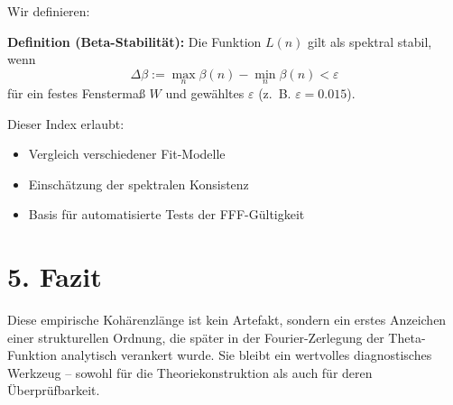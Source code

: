 \documentclass[12pt]{article}
\begin{document}
Wir definieren:

\textbf{Definition (Beta-Stabilität):}  
Die Funktion \( L(n) \) gilt als spektral stabil, wenn  
\[
\Delta \beta := \max_n \beta(n) - \min_n \beta(n) < \varepsilon
\]
für ein festes Fenstermaß \( W \) und gewähltes \( \varepsilon \) (z.~B. \( \varepsilon = 0.015 \)).

Dieser Index erlaubt:
\begin{itemize}
  \item Vergleich verschiedener Fit-Modelle
  \item Einschätzung der spektralen Konsistenz
  \item Basis für automatisierte Tests der FFF-Gültigkeit
\end{itemize}

\section*{5. Fazit}

Diese empirische Kohärenzlänge ist kein Artefakt, sondern ein erstes Anzeichen einer strukturellen Ordnung, die später in der Fourier-Zerlegung der Theta-Funktion analytisch verankert wurde.  
Sie bleibt ein wertvolles diagnostisches Werkzeug – sowohl für die Theoriekonstruktion als auch für deren Überprüfbarkeit.
\end{document}
